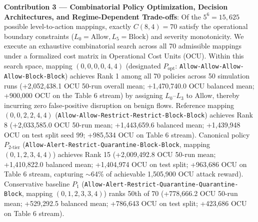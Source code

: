 \documentclass[journal,10pt,onecolumn]{IEEEtran}
\begin{document}
\textbf{Contribution 3 --- Combinatorial Policy Optimization, Decision Architectures, and Regime-Dependent Trade-offs}:
Of the $5^6 = 15,625$ possible level-to-action mappings, exactly $C(8,4) = 70$ satisfy the operational boundary constraints ($L_0 = \text{Allow}, L_5 = \text{Block}$) and severity monotonicity. We execute an exhaustive combinatorial search across all 70 admissible mappings under a formalized cost matrix in Operational Cost Units (OCU). Within this search space, mapping $(0,0,0,0,4,4)$ (designated $P_{\text{opt}}$: \texttt{Allow-Allow-Allow-Allow-Block-Block}) achieves Rank 1 among all 70 policies across 50 simulation runs (+2,052,438.1 OCU 50-run overall mean; +1,470,740.0 OCU balanced mean; +900,000 OCU on the Table 6 stream) by assigning $L_0$--$L_3$ to Allow, thereby incurring zero false-positive disruption on benign flows. Reference mapping $(0,0,2,2,4,4)$ (\texttt{Allow-Allow-Restrict-Restrict-Block-Block}) achieves Rank 8 (+2,033,585.0 OCU 50-run mean; +1,443,659.6 balanced mean; +1,439,948 OCU on test split seed 99; +985,534 OCU on Table 6 stream). Canonical policy $P_{2\text{-tier}}$ (\texttt{Allow-Alert-Restrict-Quarantine-Block-Block}, mapping $(0,1,2,3,4,4)$) achieves Rank 15 (+2,009,492.8 OCU 50-run mean; +1,410,822.0 balanced mean; +1,404,974 OCU on test split; +963,686 OCU on Table 6 stream, capturing $\sim$64\% of achievable 1,505,900 OCU attack reward). Conservative baseline $P_1$ (\texttt{Allow-Alert-Restrict-Quarantine-Quarantine-Block}, mapping $(0,1,2,3,3,4)$) ranks 50th of 70 (+778,666.2 OCU 50-run mean; +529,292.5 balanced mean; +786,643 OCU on test split; +423,686 OCU on Table 6 stream).
\end{document}
